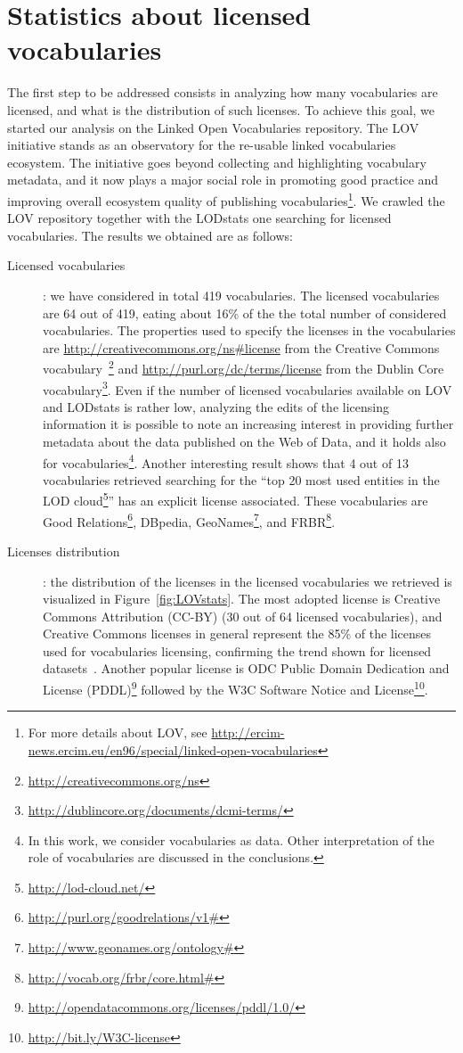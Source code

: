 \section{Statistics about licensed vocabularies}
\label{sec:stats-license}
The first step to be addressed consists in analyzing how many vocabularies are licensed, and what is the distribution of such licenses. To achieve this goal, we started our analysis on the Linked Open Vocabularies repository. The LOV initiative stands as an observatory for the re-usable linked vocabularies ecosystem. The initiative goes beyond collecting and highlighting vocabulary metadata, and it now plays a major social role in promoting good practice and improving overall ecosystem quality of publishing vocabularies\footnote{For more details about LOV, see \url{http://ercim-news.ercim.eu/en96/special/linked-open-vocabularies}}. We crawled the LOV repository together with the LODstats one searching for licensed vocabularies. The results we obtained are as follows:
\begin{description}
\item[Licensed vocabularies]: we have considered in total 419 vocabularies. The licensed vocabularies are 64 out of 419, eating about 16\% of the the total number of considered vocabularies. The properties used to specify the licenses in the vocabularies are \url{http://creativecommons.org/ns\#license} from the Creative Commons vocabulary~\footnote{\url{http://creativecommons.org/ns}} and \url{http://purl.org/dc/terms/license} from the Dublin Core vocabulary\footnote{\url{http://dublincore.org/documents/dcmi-terms/}}. Even if the number of licensed vocabularies available on LOV and LODstats is rather low, analyzing the edits of the licensing information it is possible to note an increasing interest in providing further metadata about the data published on the Web of Data, and it holds also for vocabularies\footnote{In this work, we consider vocabularies as data. Other interpretation of the role of vocabularies are discussed in the conclusions.}. Another interesting result shows that 4 out of 13 vocabularies retrieved searching for the ``top 20 most used entities in the LOD cloud\footnote{\url{http://lod-cloud.net/}}'' has an explicit license associated. These vocabularies are Good Relations\footnote{\url{http://purl.org/goodrelations/v1\#}}, DBpedia, GeoNames\footnote{\url{http://www.geonames.org/ontology\#}}, and FRBR\footnote{\url{http://vocab.org/frbr/core.html\#}}.
\item[Licenses distribution]: the distribution of the licenses in the licensed vocabularies we retrieved is visualized in Figure~\ref{fig:LOVstats}. The most adopted license is Creative Commons Attribution (CC-BY) (30 out of 64 licensed vocabularies), and Creative Commons licenses in general represent the 85\% of the licenses used for vocabularies licensing, confirming the trend shown for licensed datasets~\cite{DBLP:conf/semweb/Rodriguez-DoncelGM13,DBLP:conf/semweb/GovernatoriRVG13}. Another popular license is ODC Public Domain Dedication and License (PDDL)\footnote{\url{http://opendatacommons.org/licenses/pddl/1.0/}} followed by the W3C Software Notice and License\footnote{\url{http://bit.ly/W3C-license}}.
\end{description}

